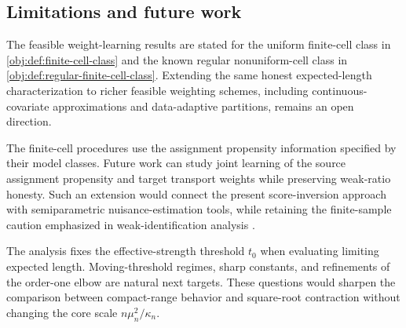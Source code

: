 \subsection{Limitations and future work}

The feasible weight-learning results are stated for the uniform finite-cell class in \cref{obj:def:finite-cell-class} and the known regular nonuniform-cell class in \cref{obj:def:regular-finite-cell-class}. Extending the same honest expected-length characterization to richer feasible weighting schemes, including continuous-covariate approximations and data-adaptive partitions, remains an open direction.

The finite-cell procedures use the assignment propensity information specified by their model classes. Future work can study joint learning of the source assignment propensity and target transport weights while preserving weak-ratio honesty. Such an extension would connect the present score-inversion approach with semiparametric nuisance-estimation tools, while retaining the finite-sample caution emphasized in weak-identification analysis \citep{ArmstrongKolesar2021}.

The analysis fixes the effective-strength threshold \(t_0\) when evaluating limiting expected length. Moving-threshold regimes, sharp constants, and refinements of the order-one elbow are natural next targets. These questions would sharpen the comparison between compact-range behavior and square-root contraction without changing the core scale \(n\mu_n^2/\kappa_n\).
